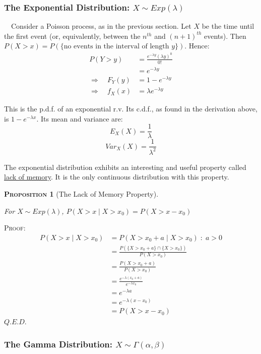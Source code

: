 \documentclass[12pt,a4paper]{article}
\newtheorem{proposition}{\textsc{Proposition}}[section]
\begin{document}
\subsubsection{The Exponential Distribution: $X \sim Exp(\lambda)$}

$\quad$Consider a Poisson process, as in the previous section. Let $X$ be the time until the first event (or, equivalently, between the $n^{th}$ and $(n+1)^{th}$ events). Then\\ $P(X>x) = P(\{\text{no events in the interval of length $y$}\})$. Hence:
\begin{align*}
 P(Y>y) &= \frac{e^{-\lambda y}(\lambda y)^0}{0!}\\
 &= e^{-\lambda y}\\
\Rightarrow \quad F_Y(y) &= 1 - e^{-\lambda y}\\
\Rightarrow\quad f_X(x) &= \lambda e^{-\lambda y}
\end{align*}

This is the p.d.f. of an exponential r.v. Its c.d.f., as found in the derivation above, is $1-e^{-\lambda x}$. Its mean and variance are:
$$E_{X}(X) = \frac{1}{\lambda}$$
$$Var_{X}(X) = \frac{1}{\lambda^2}$$

The exponential distribution exhibits an interesting and useful property called \underline{lack of memory}. It is the only continuous distribution with this property.

\begin{proposition}[The Lack of Memory Property]$\quad$\par
\vspace{1cm}

For $X \sim Exp(\lambda)$, $P(X>x\; | \; X>x_0) = P(X>x-x_0)$
\end{proposition}

\noindent\textsc{Proof:}
\begin{align*}
P(X>x\; | \; X>x_0) &= P(X > x_0 + a\; | \; X > x_0) \; : \; a>0\\
&= \frac{P(\{X > x_0 + a\}\cap \{X > x_0\})}{P(X > x_0)}\\
&= \frac{P(X > x_0 + a)}{P(X > x_0)}\\
&=\frac{e^{-\lambda (x_0 + a)}}{e^{-\lambda x_0}}\\
&= e^{-\lambda a}\\
&= e^{-\lambda (x-x_0)}\\
&= P(X>x-x_0)
\end{align*}
\hfill$Q.E.D.$

\subsubsection{The Gamma Distribution: $X \sim \Gamma(\alpha,\beta)$}
\end{document}
